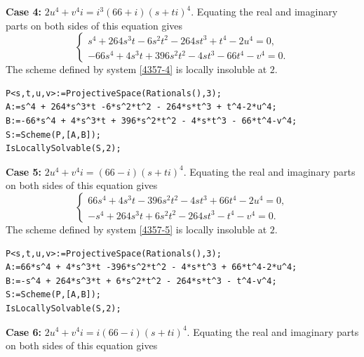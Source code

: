 \documentclass[a4paper,12pt,english,reqno]{amsart}
\begin{document}
{\bf Case 4:} $2u^4+v^4i=i^3(66+i)(s+ti)^4$. Equating the real and imaginary parts on both sides of this equation gives
\begin{equation}\label{4357-4}
\begin{cases}
s^4 + 264s^3t - 6s^2t^2 - 264st^3 + t^4 - 2u^4=0,\\
-66s^4 + 4s^3t + 396s^2t^2 - 4st^3 - 66t^4 - v^4=0.
\end{cases}
\end{equation}
The scheme defined by system \eqref{4357-4} is locally insoluble at $2$.
\begin{lstlisting}
P<s,t,u,v>:=ProjectiveSpace(Rationals(),3);
A:=s^4 + 264*s^3*t -6*s^2*t^2 - 264*s*t^3 + t^4-2*u^4;
B:=-66*s^4 + 4*s^3*t + 396*s^2*t^2 - 4*s*t^3 - 66*t^4-v^4;
S:=Scheme(P,[A,B]);
IsLocallySolvable(S,2);
\end{lstlisting}

{\bf Case 5:} $2u^4+v^4i=(66-i)(s+ti)^4$. Equating the real and imaginary parts on both sides of this equation gives
\begin{equation}\label{4357-5}
\begin{cases}
66s^4 + 4s^3t - 396s^2t^2 - 4st^3 + 66t^4 - 2u^4=0,\\
-s^4 + 264s^3t + 6s^2t^2 - 264st^3 - t^4 - v^4=0.
\end{cases}
\end{equation}
The scheme defined by system \eqref{4357-5} is locally insoluble at $2$.

\begin{lstlisting}
P<s,t,u,v>:=ProjectiveSpace(Rationals(),3);
A:=66*s^4 + 4*s^3*t -396*s^2*t^2 - 4*s*t^3 + 66*t^4-2*u^4;
B:=-s^4 + 264*s^3*t + 6*s^2*t^2 - 264*s*t^3 - t^4-v^4;
S:=Scheme(P,[A,B]);
IsLocallySolvable(S,2);
\end{lstlisting}
{\bf Case 6:} $2u^4+v^4i=i(66-i)(s+ti)^4$. Equating the real and imaginary parts on both sides of this equation gives
\end{document}

